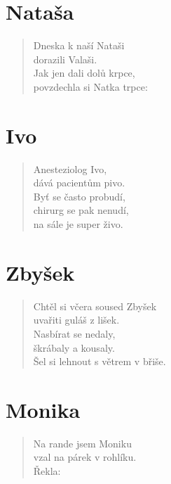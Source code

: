 \section*{Nataša}
\begin{verse}
Dneska k naší Nataši\\
dorazili Valaši.\\
Jak jen dali dolů krpce,\\
povzdechla si Natka trpce:\\
\end{verse}

\section*{Ivo}
\begin{verse}
Anesteziolog Ivo,\\
dává pacientům pivo.\\
Byť se často probudí,\\
chirurg se pak nenudí,\\
na sále je super živo.
\end{verse}

\section*{Zbyšek}
\begin{verse}
Chtěl si včera soused Zbyšek\\
uvařiti guláš z lišek.\\
Nasbírat se nedaly,\\
škrábaly a kousaly.\\
Šel si lehnout s větrem v břiše.
\end{verse}

\section*{Monika}
\begin{verse}
Na rande jsem Moniku\\
vzal na párek v rohlíku.\\
Řekla: 
\end{verse}

